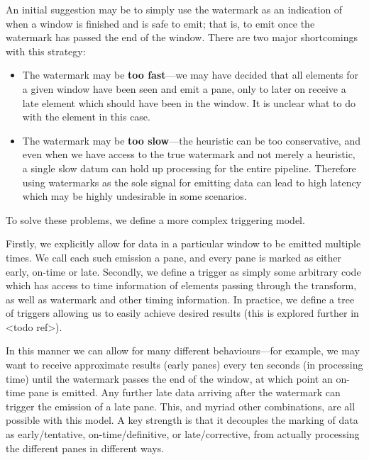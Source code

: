 An initial suggestion may be to simply use the watermark as an indication of when a window is finished and is safe to emit; that is, to emit once the watermark has passed the end of the window.
There are two major shortcomings with this strategy:
\begin{itemize}
	\item The watermark may be \textbf{too fast}---we may have decided that all elements for a given window have been seen and emit a pane, only to later on receive a late element which should have been in the window.
	It is unclear what to do with the element in this case.
	
	\item The watermark may be \textbf{too slow}---the heuristic can be too conservative, and even when we have access to the true watermark and not merely a heuristic, a single slow datum can hold up processing for the entire pipeline.
	Therefore using watermarks as the sole signal for emitting data can lead to high latency which may be highly undesirable in some scenarios.
\end{itemize} 

To solve these problems, we define a more complex triggering model.

Firstly, we explicitly allow for data in a particular window to be emitted multiple times.
We call each such emission a pane, and every pane is marked as either early, on-time or late.
Secondly, we define a trigger as simply some arbitrary code which has access to time information of elements passing through the transform, as well as watermark and other timing information.
In practice, we define a tree of triggers allowing us to easily achieve desired results (this is explored further in <todo ref>). 

In this manner we can allow for many different behaviours---for example, we may want to receive approximate results (early panes) every ten seconds (in processing time) until the watermark passes the end of the window, at which point an on-time pane is emitted.
Any further late data arriving after the watermark can trigger the emission of a late pane.
This, and myriad other combinations, are all possible with this model.
A key strength is that it decouples the marking of data as early/tentative, on-time/definitive, or late/corrective, from actually processing the different panes in different ways.


